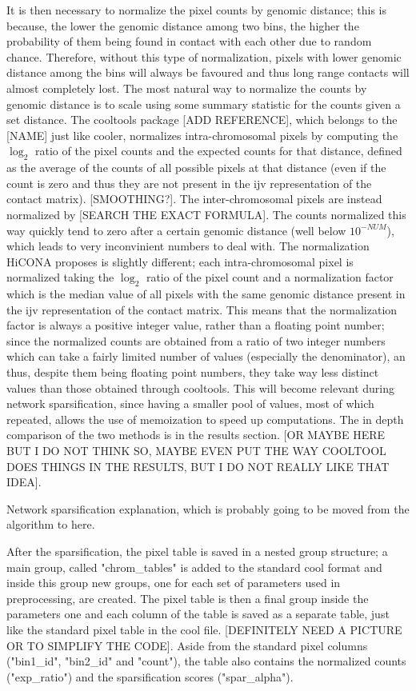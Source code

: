 It is then necessary to normalize the pixel counts by genomic distance; this is because, the lower the genomic distance among two bins, the higher the probability of them being found in contact with each other due to random chance. Therefore, without this type of normalization, pixels with lower genomic distance among the bins will always be favoured and thus long range contacts will almost completely lost. The most natural way to normalize the counts by genomic distance is to scale using some summary statistic for the counts given a set distance. 
The cooltools package [ADD REFERENCE], which belongs to the [NAME] just like cooler, normalizes intra-chromosomal pixels by computing the $\log_2$ ratio of the pixel counts and the expected counts for that distance, defined as the average of the counts of all possible pixels at that distance (even if the count is zero and thus they are not present in the ijv representation of the contact matrix). [SMOOTHING?]. The inter-chromosomal pixels are instead normalized by [SEARCH THE EXACT FORMULA]. The counts normalized this way quickly tend to zero after a certain genomic distance (well below $10^{-NUM}$), which leads to very inconvinient numbers to deal with. 
The normalization HiCONA proposes is slightly different; each intra-chromosomal pixel is normalized taking the $\log_2$ ratio of the pixel count and a normalization factor which is the median value of all pixels with the same genomic distance present in the ijv representation of the contact matrix. This means that the normalization factor is always a positive integer value, rather than a floating point number; since the normalized counts are obtained from a ratio of two integer numbers which can take a fairly limited number of values (especially the denominator), an thus, despite them being floating point numbers, they take way less distinct values than those obtained through cooltools. This will become relevant during network sparsification, since having a smaller pool of values, most of which repeated, allows the use of memoization to speed up computations.
The in depth comparison of the two methods is in the results section. [OR MAYBE HERE BUT I DO NOT THINK SO, MAYBE EVEN PUT THE WAY COOLTOOL DOES THINGS IN THE RESULTS, BUT I DO NOT REALLY LIKE THAT IDEA].

Network sparsification explanation, which is probably going to be moved from the algorithm to here.

After the sparsification, the pixel table is saved in a nested group structure; a main group, called "chrom\_tables" is added to the standard cool format and inside this group new groups, one for each set of parameters used in preprocessing, are created. The pixel table is then a final group inside the parameters one and each column of the table is saved as a separate table, just like the standard pixel table in the cool file. [DEFINITELY NEED A PICTURE OR TO SIMPLIFY THE CODE]. Aside from the standard pixel columns ("bin1\_id", "bin2\_id" and "count"), the table also contains the normalized counts ("exp\_ratio") and the sparsification scores ("spar\_alpha").

